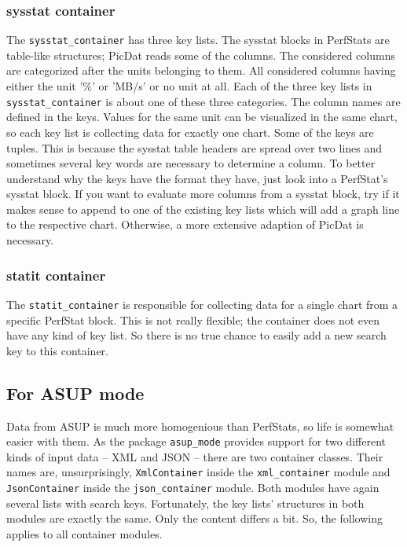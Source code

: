 \documentclass[a4paper,11pt]{article}
\begin{document}
\subsubsection*{sysstat container}
The \verb|sysstat_container| has three key lists. The sysstat blocks in PerfStats are table-like structures; PicDat reads some of the columns. The considered columns are categorized after the units belonging to them. All considered columns having either the unit '\%' or 'MB/s' or no unit at all. Each of the three key lists in \verb|sysstat_container| is about one of these three categories. The column names are defined in the keys. Values for the same unit can be visualized in the same chart, so each key list is collecting data for exactly one chart. Some of the keys are tuples. This is because the sysstat table headers are spread over two lines and sometimes several key words are necessary to determine a column. To better understand why the keys have the format they have, just look into a PerfStat's sysstat block. If you want to evaluate more columns from a sysstat block, try if it makes sense to append to one of the existing key lists which will add a graph line to the respective chart. Otherwise, a more extensive adaption of PicDat is necessary.

\subsubsection*{statit container}
The \verb|statit_container| is responsible for collecting data for a single chart from a specific PerfStat block. This is not really flexible; the container does not even have any kind of key list. So there is no true chance to easily add a new search key to this container.

\subsection*{For ASUP mode}
Data from ASUP is much more homogenious than PerfStats, so life is somewhat easier with them. As the package \verb|asup_mode| provides support for two different kinds of input data -- XML and JSON -- there are two container classes. Their names are, unsurprisingly, \verb|XmlContainer| inside the \verb|xml_container| module and \verb|JsonContainer| inside the \verb|json_container| module. Both modules have again several lists with search keys. Fortunately, the key lists' structures in both modules are exactly the same. Only the content differs a bit. So, the following applies to all container modules. 
\bigskip
\end{document}
